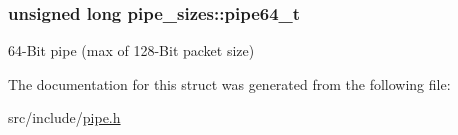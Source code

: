 \subsubsection[{pipe64\+\_\+t}]{\setlength{\rightskip}{0pt plus 5cm}unsigned long pipe\+\_\+sizes\+::pipe64\+\_\+t}\hypertarget{structpipe__sizes_a442e035eb8f5cbc6a674ca3737bd938f}{}\label{structpipe__sizes_a442e035eb8f5cbc6a674ca3737bd938f}
64-\/\+Bit pipe (max of 128-\/\+Bit packet size) 

The documentation for this struct was generated from the following file\+:\begin{DoxyCompactItemize}
\item 
src/include/\hyperlink{pipe_8h}{pipe.\+h}\end{DoxyCompactItemize}

